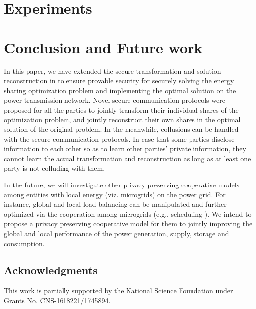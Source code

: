 \documentclass{article}
\begin{document}
\section{Experiments}
\label{sec:exp}



\section{Conclusion and Future work}
In this paper, we have extended the secure transformation and solution reconstruction in \cite{HongIJER15} to ensure provable security for securely solving the energy sharing optimization problem and implementing the optimal solution on the power transmission network. Novel secure communication protocols were proposed for all the parties to jointly transform their individual shares of the optimization problem, and jointly reconstruct their own shares in the optimal solution of the original problem. In the meanwhile, collusions can be handled with the secure communication protocols. In case that some parties disclose information to each other so as to learn other parties' private information, they cannot learn the actual transformation and reconstruction as long as at least one party is not colluding with them.

In the future, we will investigate other privacy preserving cooperative models among entities with local energy (viz. microgrids) on the power grid. For instance, global and local load balancing can be manipulated and further optimized via the cooperation among microgrids (e.g., scheduling \cite{HongEnergies17,liuscheduling17}). We intend to propose a privacy preserving cooperative model for them to jointly improving the global and local performance of the power generation, supply, storage and consumption.  

\subsection*{Acknowledgments}
This work is partially supported by the National Science Foundation under Grants No. CNS-1618221/1745894.

% 
%

\end{document}
